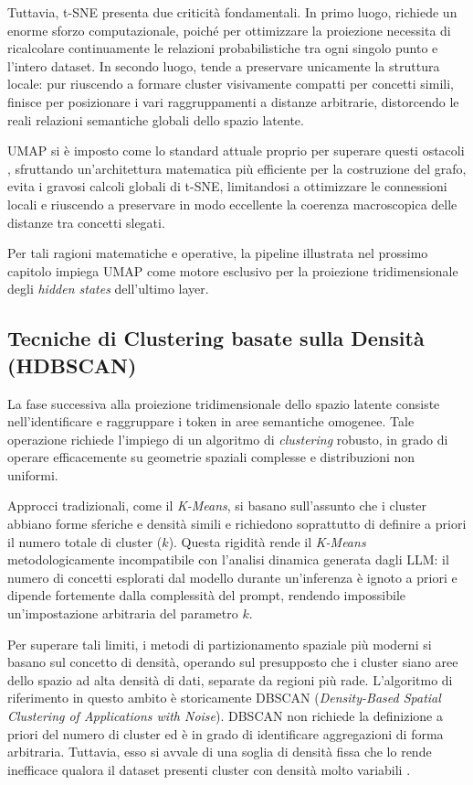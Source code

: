Tuttavia, t-SNE presenta due criticità fondamentali. In primo luogo, richiede un enorme sforzo computazionale, poiché per ottimizzare la proiezione necessita di ricalcolare continuamente le relazioni probabilistiche tra ogni singolo punto e l'intero dataset. In secondo luogo, tende a preservare unicamente la struttura locale: pur riuscendo a formare cluster visivamente compatti per concetti simili, finisce per posizionare i vari raggruppamenti a distanze arbitrarie, distorcendo le reali relazioni semantiche globali dello spazio latente.

UMAP si è imposto come lo standard attuale proprio per superare questi ostacoli \cite{mcinnes2018umap}, sfruttando un'architettura matematica più efficiente per la costruzione del grafo, evita i gravosi calcoli globali di t-SNE, limitandosi a ottimizzare le connessioni locali e riuscendo a preservare in modo eccellente la coerenza macroscopica delle distanze tra concetti slegati.

Per tali ragioni matematiche e operative, la pipeline illustrata nel prossimo capitolo impiega UMAP come motore esclusivo per la proiezione tridimensionale degli \textit{hidden states} dell'ultimo layer.

\subsection{Tecniche di Clustering basate sulla Densità (HDBSCAN)}
\label{sec:clustering_hdbscan}

La fase successiva alla proiezione tridimensionale dello spazio latente consiste nell'identificare e raggruppare i token in aree semantiche omogenee. Tale operazione richiede l'impiego di un algoritmo di \textit{clustering} robusto, in grado di operare efficacemente su geometrie spaziali complesse e distribuzioni non uniformi.

Approcci tradizionali, come il \textit{K-Means}, si basano sull'assunto che i cluster abbiano forme sferiche e densità simili e richiedono soprattutto di definire a priori il numero totale di cluster ($k$). Questa rigidità rende il \textit{K-Means} metodologicamente incompatibile con l'analisi dinamica generata dagli LLM: il numero di concetti esplorati dal modello durante un'inferenza è ignoto a priori e dipende fortemente dalla complessità del prompt, rendendo impossibile un'impostazione arbitraria del parametro $k$. 

Per superare tali limiti, i metodi di partizionamento spaziale più moderni si basano sul concetto di densità, operando sul presupposto che i cluster siano aree dello spazio ad alta densità di dati, separate da regioni più rade. L'algoritmo di riferimento in questo ambito è storicamente DBSCAN (\textit{Density-Based Spatial Clustering of Applications with Noise}). DBSCAN non richiede la definizione a priori del numero di cluster ed è in grado di identificare aggregazioni di forma arbitraria. Tuttavia, esso si avvale di una soglia di densità fissa che lo rende inefficace qualora il dataset presenti cluster con densità molto variabili \cite{campello2013density}.

